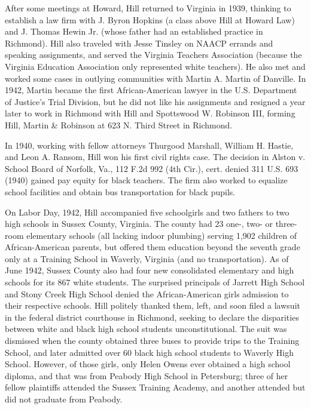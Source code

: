 After some meetings at Howard, Hill returned to Virginia in 1939,
thinking to establish a law firm with J. Byron Hopkins (a class above
Hill at Howard Law) and J. Thomas Hewin Jr. (whose father had an
established practice in Richmond). Hill also traveled with Jesse Tinsley
on NAACP errands and speaking assignments, and served the Virginia
Teachers Association (because the Virginia Education Association only
represented white teachers). He also met and worked some cases in
outlying communities with Martin A. Martin of Danville. In 1942, Martin
became the first African-American lawyer in the U.S. Department of
Justice's Trial Division, but he did not like his assignments and
resigned a year later to work in Richmond with Hill and Spottswood W.
Robinson III, forming Hill, Martin \& Robinson at 623 N. Third Street in
Richmond.

In 1940, working with fellow attorneys Thurgood Marshall, William H.
Hastie, and Leon A. Ransom, Hill won his first civil rights case. The
decision in Alston v. School Board of Norfolk, Va., 112 F.2d 992 (4th
Cir.), cert. denied 311 U.S. 693 (1940) gained pay equity for black
teachers. The firm also worked to equalize school facilities and obtain
bus transportation for black pupils.

On Labor Day, 1942, Hill accompanied five schoolgirls and two fathers to
two high schools in Sussex County, Virginia. The county had 23 one-,
two- or three- room elementary schools (all lacking indoor plumbing)
serving 1,902 children of African-American parents, but offered them
education beyond the seventh grade only at a Training School in Waverly,
Virginia (and no transportation). As of June 1942, Sussex County also
had four new consolidated elementary and high schools for its 867 white
students. The surprised principals of Jarrett High School and Stony
Creek High School denied the African-American girls admission to their
respective schools. Hill politely thanked them, left, and soon filed a
lawsuit in the federal district courthouse in Richmond, seeking to
declare the disparities between white and black high school students
unconstitutional. The suit was dismissed when the county obtained three
buses to provide trips to the Training School, and later admitted over
60 black high school students to Waverly High School. However, of those
girls, only Helen Owens ever obtained a high school diploma, and that
was from Peabody High School in Petersburg; three of her fellow
plaintiffs attended the Sussex Training Academy, and another attended
but did not graduate from Peabody.

